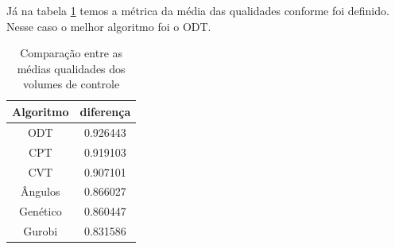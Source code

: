 Já na tabela \ref{tab:comparacao-qualidade} temos a métrica da média das qualidades conforme foi definido. Nesse caso o melhor algoritmo foi o ODT.

\begin{table}
    \centering
    \par\caption{Comparação entre as médias qualidades dos volumes de controle}
    \begin{tabular}{c|c}
        Algoritmo&diferença\\\hline\hline
        ODT      &  0.926443 \\\hline
        CPT      &  0.919103 \\\hline
        CVT      &  0.907101 \\\hline
        Ângulos  &  0.866027 \\\hline
        Genético &  0.860447 \\\hline
        Gurobi   &  0.831586 \\\hline
    \end{tabular}
    \label{tab:comparacao-qualidade}
\end{table}